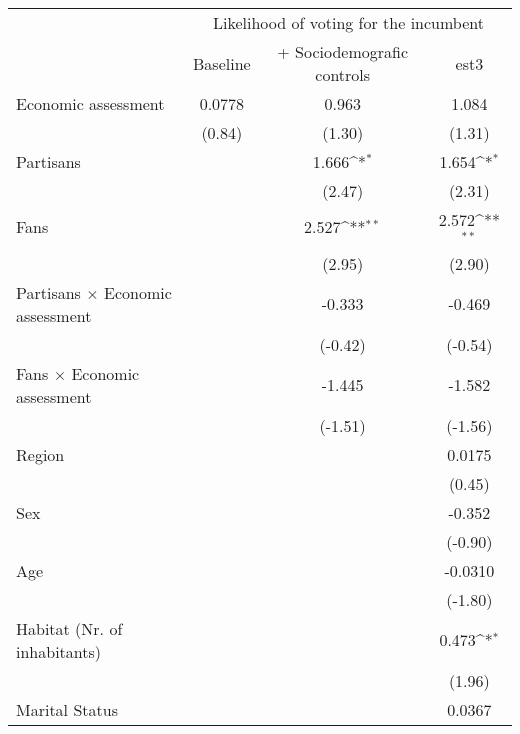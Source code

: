 {
\def\sym#1{\ifmmode^{#1}\else\(^{#1}\)\fi}
\begin{tabular}{l*{3}{c}}
\toprule
                &\multicolumn{3}{c}{Likelihood of voting for the incumbent}\\\cmidrule(lr){2-4}
                & Baseline         &+ Sociodemografic controls         &     est3         \\
\midrule
Economic assessment&   0.0778         &    0.963         &    1.084         \\
                &   (0.84)         &   (1.30)         &   (1.31)         \\
Partisans       &                  &    1.666\sym{*}  &    1.654\sym{*}  \\
                &                  &   (2.47)         &   (2.31)         \\
Fans            &                  &    2.527\sym{**} &    2.572\sym{**} \\
                &                  &   (2.95)         &   (2.90)         \\
Partisans $\times$ Economic assessment&                  &   -0.333         &   -0.469         \\
                &                  &  (-0.42)         &  (-0.54)         \\
Fans $\times$ Economic assessment&                  &   -1.445         &   -1.582         \\
                &                  &  (-1.51)         &  (-1.56)         \\
Region          &                  &                  &   0.0175         \\
                &                  &                  &   (0.45)         \\
Sex             &                  &                  &   -0.352         \\
                &                  &                  &  (-0.90)         \\
Age             &                  &                  &  -0.0310         \\
                &                  &                  &  (-1.80)         \\
Habitat (Nr. of inhabitants)&                  &                  &    0.473\sym{*}  \\
                &                  &                  &   (1.96)         \\
Marital Status  &                  &                  &   0.0367         \\

\end{tabular}}
